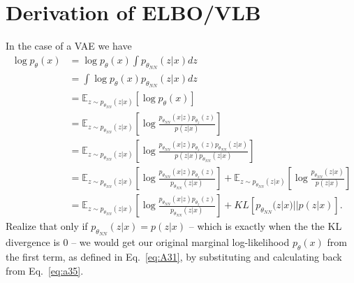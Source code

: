 \section{Derivation of ELBO/VLB}
In the case of a VAE we have
\begin{align}
    \log p_{\theta}(x) & = \log p_{\theta}(x) \int p_{\theta_{NN}}(z|x)dz                                                                                                                                                                           \\
                       & = \int \log p_{\theta}(x) p_{\theta_{NN}}(z|x)dz                                                                                                                                                                           \\
                       & = \mathbb{E}_{z\sim p_{\theta_{NN}}(z|x)}\left[\log p_{\theta}(x) \right]        \label{eq:A21}                                                                                                                            \\
                       & = \mathbb{E}_{z\sim p_{\theta_{NN}}(z|x)}\left[\log \frac{p_{\theta_{NN}}(x|z)p_{\theta_z}(z)}{p(z|x)}\right]   \label{eq:A31}                                                                                             \\
                       & = \mathbb{E}_{z\sim p_{\theta_{NN}}(z|x)}\left[\log \frac{p_{\theta_{NN}}(x|z)p_{\theta_z}(z)p_{\theta_{NN}}(z|x)}{p(z|x)p_{\theta_{NN}}(z|x)}\right]                      \label{eq:a35}                                  \\
                       & = \mathbb{E}_{z\sim p_{\theta_{NN}}(z|x)}\left[\log \frac{p_{\theta_{NN}}(x|z)p_{\theta_z}(z)}{p_{\theta_{NN}}(z|x)}\right] + \mathbb{E}_{z\sim p_{\theta_{NN}}(z|x)}\left[\log \frac{p_{\theta_{NN}}(z|x)}{p(z|x)}\right] \\
                       & = \mathbb{E}_{z\sim p_{\theta_{NN}}(z|x)}\left[\log \frac{p_{\theta_{NN}}(x|z)p_{\theta_z}(z)}{p_{\theta_{NN}}(z|x)}\right] + KL \left[p_{\theta_{NN}}(z|x)||p(z|x)\right].
\end{align}
Realize that only if $p_{\theta_{NN}}(z|x) = p(z|x)$ -- which is exactly when the the KL divergence is 0 -- we would get our original marginal log-likelihood $p_{\theta}(x)$ from the first term, as defined in Eq.~\ref{eq:A31}, by substituting and calculating back from Eq.~\ref{eq:a35}.
